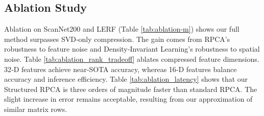 \documentclass[runningheads]{llncs}
\begin{document}
\subsection{Ablation Study}
Ablation on ScanNet200 and LERF (Table \ref{tab:ablation-m}) shows our full method surpasses SVD‑only compression. The gain comes from RPCA’s robustness to feature noise and Density‑Invariant Learning’s robustness to spatial noise.
Table \ref{tab:ablation_rank_tradeoff} ablates compressed feature dimensions. 32‑D features achieve near‑SOTA accuracy, whereas 16‑D features balance accuracy and inference efficiency.
Table \ref{tab:ablation_latency} shows that our Structured RPCA is three orders of magnitude faster than standard RPCA. The slight increase in error remains acceptable, resulting from our approximation of similar matrix rows.
\vspace{-1.0em}
\end{document}
